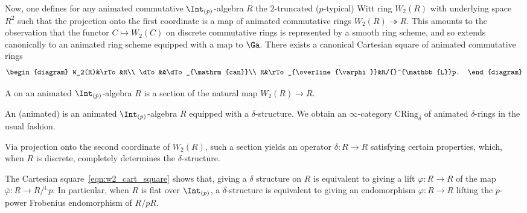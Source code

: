 \documentclass[10pt]{amsart}
\begin{document}
\subsubsection{}
Now, one defines for any animated commutative $\Int_{(p)}$-algebra $R$ the $2$-truncated ($p$-typical) Witt ring $W_2(R)$ with underlying space $R^2$ such that the projection onto the first coordinate is a map of animated commutative rings $W_2(R)\twoheadrightarrow R$. This amounts to the observation that the functor $C\mapsto W_2(C)$ on discrete commutative rings is represented by a smooth ring scheme, and so extends canonically to an animated ring scheme equipped with a map to $\Ga$. There exists a canonical Cartesian square of animated commutative rings
\begin{align}\label{eqn:w2_cart_square}
\begin{diagram}
W_2(R)&\rTo&R\\
\dTo&&\dTo_{\mathrm{can}}\\
R&\rTo_{\overline{\varphi}}&R/{}^{\mathbb{L}}p.
\end{diagram} 
\end{align}

\begin{definition}
A  on an animated $\Int_{(p)}$-algebra $R$ is a section of the natural map $W_2(R)\to R$.

An (animated)  is an animated $\Int_{(p)}$-algebra $R$ equipped with a $\delta$-structure. We obtain an $\infty$-category $\mathrm{CRing}_\delta$ of animated $\delta$-rings in the usual fashion. 
\end{definition}

\begin{remark}
Via projection onto the second coordinate of $W_2(R)$, such a section yields an operator $\delta:R\to R$ satisfying certain properties, which, when $R$ is discrete, completely determines the $\delta$-structure.
\end{remark}

\begin{remark}
The Cartesian square~\eqref{eqn:w2_cart_square} shows that, giving a $\delta$ structure on $R$ is equivalent to giving a lift $\varphi:R\to R$ of the map $\overline{\varphi}:R\to R/{}^{\mathbb{L}}p$. In particular, when $R$ is flat over $\Int_{(p)}$, a $\delta$-structure is equivalent to giving an endomorphism $\varphi:R\to R$ lifting the $p$-power Frobenius endomorphism of $R/pR$.
\end{remark}
\end{document}
